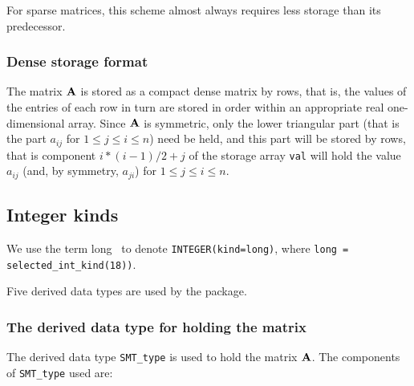 \documentclass{galahad}
\begin{document}
For sparse matrices, this scheme almost always requires less storage than
its predecessor.

\subsubsection{Dense storage format}\label{dense}
The matrix ${\mathbf{A}}$ is stored as a compact
dense matrix by rows, that is, the values of the entries of each row in turn are
stored in order within an appropriate real one-dimensional array.
Since ${\mathbf{A}}$ is symmetric, only the lower triangular part (that is the part
$a_{ij}$ for $1 \leq j \leq i \leq n$) need be held, and this part will be
stored by rows, that is component
$i \ast (i-1)/2 + j$ of the storage array {\tt val}
will hold the value $a_{ij}$ (and, by symmetry, $a_{ji}$)
for $1 \leq j \leq i \leq n$.



\subsection{Integer kinds}\label{Integer kinds}
We use the term
long \integer\ to denote {\tt INTEGER\-(kind=long)}, where
{\tt long = selected\_int\_kind(18))}.





\galtypes
Five derived data types are used by the package.


\subsubsection{The derived data type for holding the matrix}\label{typeprob}
The derived data type {\tt SMT\_type} is used to hold the matrix ${\mathbf{A}}$.
The components of {\tt SMT\_type} used are:
\end{document}
